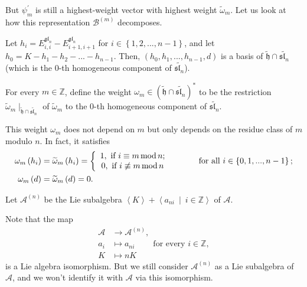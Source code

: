 \documentclass[etingof-lie.tex]{subfiles}
\begin{document}
But $\psi_{m}^{\prime}$ is still a highest-weight vector with highest weight
$\widetilde{\omega}_{m}$. Let us look at how this representation
$\mathcal{B}^{\left(  m\right)  }$ decomposes.

\begin{definition}
Let $h_{i}=E_{i,i}^{\mathfrak{gl}_{n}}-E_{i+1,i+1}^{\mathfrak{gl}_{n}}$ for
$i\in\left\{  1,2,...,n-1\right\}  $, and let $h_{0}=K-h_{1}-h_{2}%
-...-h_{n-1}$. Then, $\left(  h_{0},h_{1},...,h_{n-1},d\right)  $ is a basis
of $\widetilde{\mathfrak{h}}\cap\widetilde{\mathfrak{sl}_{n}}$ (which is the
$0$-th homogeneous component of $\widetilde{\mathfrak{sl}_{n}}$).
\end{definition}

\begin{definition}
For every $m\in\mathbb{Z}$, define the weight $\omega_{m}\in\left(
\widetilde{\mathfrak{h}}\cap\widetilde{\mathfrak{sl}_{n}}\right)  ^{\ast}$ to
be the restriction $\widetilde{\omega}_{m}\mid_{\widetilde{\mathfrak{h}}%
\cap\widetilde{\mathfrak{sl}_{n}}}$ of $\widetilde{\omega}_{m}$ to the $0$-th
homogeneous component of $\widetilde{\mathfrak{sl}_{n}}$.
\end{definition}

This weight $\omega_{m}$ does not depend on $m$ but only depends on the
residue class of $m$ modulo $n$. In fact, it satisfies%
\begin{align*}
\omega_{m}\left(  h_{i}\right)   &  =\widetilde{\omega}_{m}\left(
h_{i}\right)  =\left\{
\begin{array}
[c]{c}%
1,\text{ if }i\equiv m\operatorname{mod}n;\\
0,\text{ if }i\not \equiv m\operatorname{mod}n
\end{array}
\right.  \ \ \ \ \ \ \ \ \ \ \text{for all }i\in\left\{  0,1,...,n-1\right\}
;\\
\omega_{m}\left(  d\right)   &  =\widetilde{\omega}_{m}\left(  d\right)  =0.
\end{align*}


\begin{definition}
Let $\mathcal{A}^{\left(  n\right)  }$ be the Lie subalgebra $\left\langle
K\right\rangle +\left\langle a_{ni}\ \mid\ i\in\mathbb{Z}\right\rangle $ of
$\mathcal{A}$.
\end{definition}

Note that the map%
\begin{align*}
\mathcal{A}  &  \rightarrow\mathcal{A}^{\left(  n\right)  },\\
a_{i}  &  \mapsto a_{ni}\ \ \ \ \ \ \ \ \ \ \text{for every }i\in\mathbb{Z},\\
K  &  \mapsto nK
\end{align*}
is a Lie algebra isomorphism. But we still consider $\mathcal{A}^{\left(
n\right)  }$ as a Lie subalgebra of $\mathcal{A}$, and we won't identify it
with $\mathcal{A}$ via this isomorphism.
\end{document}

